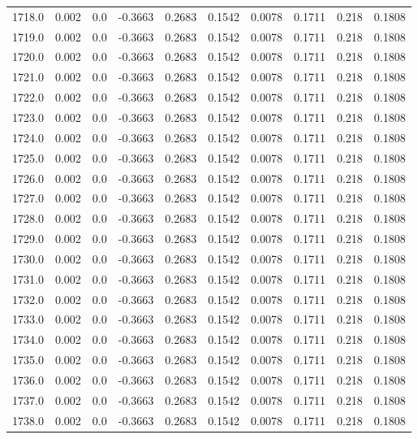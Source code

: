 \begin{longtable}{lrrrrrrrrr}
1718.0 & 0.002 & 0.0 & -0.3663 & 0.2683 & 0.1542 & 0.0078 & 0.1711 & 0.218 & 0.1808 \\
1719.0 & 0.002 & 0.0 & -0.3663 & 0.2683 & 0.1542 & 0.0078 & 0.1711 & 0.218 & 0.1808 \\
1720.0 & 0.002 & 0.0 & -0.3663 & 0.2683 & 0.1542 & 0.0078 & 0.1711 & 0.218 & 0.1808 \\
1721.0 & 0.002 & 0.0 & -0.3663 & 0.2683 & 0.1542 & 0.0078 & 0.1711 & 0.218 & 0.1808 \\
1722.0 & 0.002 & 0.0 & -0.3663 & 0.2683 & 0.1542 & 0.0078 & 0.1711 & 0.218 & 0.1808 \\
1723.0 & 0.002 & 0.0 & -0.3663 & 0.2683 & 0.1542 & 0.0078 & 0.1711 & 0.218 & 0.1808 \\
1724.0 & 0.002 & 0.0 & -0.3663 & 0.2683 & 0.1542 & 0.0078 & 0.1711 & 0.218 & 0.1808 \\
1725.0 & 0.002 & 0.0 & -0.3663 & 0.2683 & 0.1542 & 0.0078 & 0.1711 & 0.218 & 0.1808 \\
1726.0 & 0.002 & 0.0 & -0.3663 & 0.2683 & 0.1542 & 0.0078 & 0.1711 & 0.218 & 0.1808 \\
1727.0 & 0.002 & 0.0 & -0.3663 & 0.2683 & 0.1542 & 0.0078 & 0.1711 & 0.218 & 0.1808 \\
1728.0 & 0.002 & 0.0 & -0.3663 & 0.2683 & 0.1542 & 0.0078 & 0.1711 & 0.218 & 0.1808 \\
1729.0 & 0.002 & 0.0 & -0.3663 & 0.2683 & 0.1542 & 0.0078 & 0.1711 & 0.218 & 0.1808 \\
1730.0 & 0.002 & 0.0 & -0.3663 & 0.2683 & 0.1542 & 0.0078 & 0.1711 & 0.218 & 0.1808 \\
1731.0 & 0.002 & 0.0 & -0.3663 & 0.2683 & 0.1542 & 0.0078 & 0.1711 & 0.218 & 0.1808 \\
1732.0 & 0.002 & 0.0 & -0.3663 & 0.2683 & 0.1542 & 0.0078 & 0.1711 & 0.218 & 0.1808 \\
1733.0 & 0.002 & 0.0 & -0.3663 & 0.2683 & 0.1542 & 0.0078 & 0.1711 & 0.218 & 0.1808 \\
1734.0 & 0.002 & 0.0 & -0.3663 & 0.2683 & 0.1542 & 0.0078 & 0.1711 & 0.218 & 0.1808 \\
1735.0 & 0.002 & 0.0 & -0.3663 & 0.2683 & 0.1542 & 0.0078 & 0.1711 & 0.218 & 0.1808 \\
1736.0 & 0.002 & 0.0 & -0.3663 & 0.2683 & 0.1542 & 0.0078 & 0.1711 & 0.218 & 0.1808 \\
1737.0 & 0.002 & 0.0 & -0.3663 & 0.2683 & 0.1542 & 0.0078 & 0.1711 & 0.218 & 0.1808 \\
1738.0 & 0.002 & 0.0 & -0.3663 & 0.2683 & 0.1542 & 0.0078 & 0.1711 & 0.218 & 0.1808 \\

\end{longtable}
